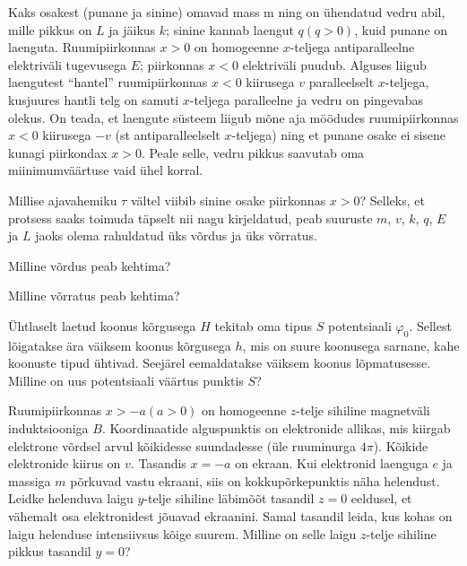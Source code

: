 \documentclass[a4paper,11pt,twocolumn]{article}
\begin{document}
\begin{question}[E-S 2010, P1]
    Kaks osakest (punane ja sinine) omavad mass m ning on ühendatud vedru abil, mille pikkus on $L$ ja jäikus $k$; sinine kannab laengut $q (q > 0)$, kuid punane on laenguta. Ruumipiirkonnas $x > 0$ on homogeenne $x$-teljega antiparalleelne elektriväli tugevusega $E$; piirkonnas $x < 0$ elektriväli puudub. Alguses liigub laengutest \enquote{hantel} ruumipiirkonnas $x < 0$ kiirusega $v$ paralleelselt $x$-teljega, kusjuures hantli telg on samuti $x$-teljega paralleelne ja vedru on pingevabas olekus. On teada, et laengute süsteem liigub mõne aja möödudes ruumipiirkonnas $x < 0$ kiirusega $−v$ (st antiparalleelselt $x$-teljega) ning et punane osake ei sisene kunagi piirkondax $x > 0$. Peale selle, vedru pikkus saavutab oma miinimumväärtuse vaid ühel korral.
    \begin{subquestion}
    \item Millise ajavahemiku \(\tau\) vältel viibib sinine osake piirkonnas $x > 0$?  Selleks, et protsess saaks toimuda täpselt nii nagu kirjeldatud, peab suuruste $m$, $v$, $k$, $q$, $E$ ja $L$ jaoks olema rahuldatud üks võrdus ja üks võrratus.
    \item Milline võrdus peab kehtima?
    \item Milline võrratus peab kehtima?
    \end{subquestion}
\end{question}

\begin{question}[Piirk 2012, G10]
    Ühtlaselt laetud koonus kõrgusega $H$ tekitab oma tipus $S$ potentsiaali \(\varphi_0\). Sellest lõigatakse ära väiksem koonus kõrgusega $h$, mis on suure koonusega sarnane, kahe koonuste tipud ühtivad. Seejärel eemaldatakse väiksem koonus lõpmatusesse. Milline on uus potentsiaali väärtus punktis $S$?
\end{question}

\begin{question}[Lõppv 2017, G10]
    Ruumipiirkonnas $x > −a (a > 0)$ on homogeenne $z$-telje sihiline magnetväli induktsiooniga $B$. Koordinaatide alguspunktis on elektronide allikas, mis kiirgab elektrone võrdsel arvul kõikidesse suundadesse (üle ruuminurga \(4\pi\)). Kõikide elektronide kiirus on $v$. Tasandis $x = −a$ on ekraan. Kui elektronid laenguga $e$ ja massiga $m$ põrkuvad vastu ekraani, siis on kokkupõrkepunktis näha helendust. Leidke helenduva laigu $y$-telje sihiline läbimõõt tasandil $z = 0$ eeldusel, et vähemalt osa elektronidest jõuavad ekraanini. Samal tasandil leida, kus kohas on laigu helenduse intensiivsus kõige suurem. Milline on selle laigu $z$-telje sihiline pikkus tasandil $y = 0$?
\end{question}
\end{document}
